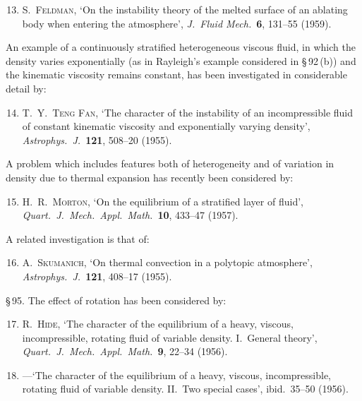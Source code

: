 \begin{enumerate}
\setcounter{enumi}{12}
\item \textsc{S.\ Feldman}, `On the instability theory of the melted surface of an ablating body when entering the atmosphere', \textit{J.\ Fluid Mech.}\ \textbf{6}, 131--55 (1959).
\end{enumerate}

An example of a continuously stratified heterogeneous viscous fluid, in which the density varies exponentially (as in Rayleigh's example considered in \S\,92\,(b)) and the kinematic viscosity remains constant, has been investigated in considerable detail by:

\begin{enumerate}
\setcounter{enumi}{13}
\item \textsc{T.\ Y.\ Teng Fan}, `The character of the instability of an incompressible fluid of constant kinematic viscosity and exponentially varying density', \textit{Astrophys.\ J.}\ \textbf{121}, 508--20 (1955).
\end{enumerate}

A problem which includes features both of heterogeneity and of variation in density due to thermal expansion has recently been considered by:

\begin{enumerate}
\setcounter{enumi}{14}
\item \textsc{H.\ R.\ Morton}, `On the equilibrium of a stratified layer of fluid', \textit{Quart.\ J.\ Mech.\ Appl.\ Math.}\ \textbf{10}, 433--47 (1957).
\end{enumerate}

A related investigation is that of:

\begin{enumerate}
\setcounter{enumi}{15}
\item \textsc{A.\ Skumanich}, `On thermal convection in a polytopic atmosphere', \textit{Astrophys.\ J.}\ \textbf{121}, 408--17 (1955).
\end{enumerate}

\medskip
\noindent\S\,95. The effect of rotation has been considered by:

\begin{enumerate}
\setcounter{enumi}{16}
\item \textsc{R.\ Hide}, `The character of the equilibrium of a heavy, viscous, incompressible, rotating fluid of variable density. I.\ General theory', \textit{Quart.\ J.\ Mech.\ Appl.\ Math.}\ \textbf{9}, 22--34 (1956).

\item[] ---`The character of the equilibrium of a heavy, viscous, incompressible, rotating fluid of variable density. II.\ Two special cases', ibid.\ 35--50 (1956).
\end{enumerate}

